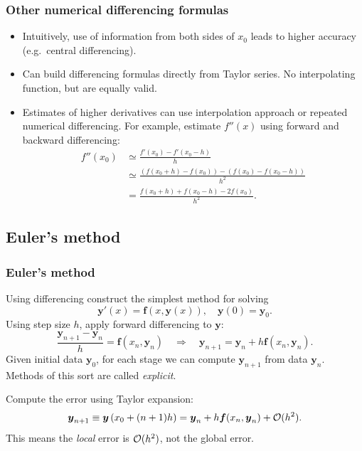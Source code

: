 \documentclass{beamer}
\newcommand{\by}{{\boldsymbol{y}}}
\newcommand{\bfm}[1]{{\boldsymbol{#1}}}
\begin{document}
\begin{frame}
  \frametitle{Other numerical differencing formulas}

  \begin{itemize}
  \item Intuitively, use of information from both sides of $x_0$ leads
    to higher accuracy (e.g.\ central differencing). \pause
  \item Can build differencing formulas directly from Taylor
    series. No interpolating function, but are equally valid.  \pause
  \item Estimates of higher derivatives can use interpolation approach
    or repeated numerical differencing. For example, estimate $f''(x)$
    using forward and backward differencing:
    \begin{align*}
      f''(x_0) & \simeq \frac{f'(x_0) - f'(x_0 - h)}{h} \\
               & \simeq \frac{\left(f(x_0 + h) - f(x_0) \right) -
                 \left(f(x_0) - f(x_0 - h) \right)}{h^2} \\
               & = \frac{f(x_0 + h) + f(x_0 - h) - 2 f(x_0)}{h^2}.
    \end{align*}
  \end{itemize}
\end{frame}


\subsection{Euler's method}


\begin{frame}
  \frametitle{Euler's method}

  Using differencing construct the simplest method for solving
  \begin{equation*}
    \by'(x) = \bfm{f}(x, \by(x)), \quad \by(0) = \by_0.
  \end{equation*}
  Using step size $h$, apply forward differencing to $\by$:
  \begin{equation*}
    \frac{\by_{n+1} - \by_n}{h} = \bfm{f}(x_n, \by_n) \quad
    \Rightarrow \quad \by_{n+1}  = \by_n + h \bfm{f}(x_n, \by_n).
  \end{equation*} \pause
  Given initial data $\by_0$, for each stage we can compute
  $\by_{n+1}$ from data $\by_n$. Methods of this sort are called
  \emph{explicit}. \pause

  \vspace{1ex}

  Compute the error using Taylor expansion:
  \begin{equation*}
    \by_{n+1} \equiv \by \left(x_0 + (n+1) h \right) = \by_n + h
    \bfm{f}(x_n, \by_n) + {\cal O}(h^2).
  \end{equation*} \pause
  This means the \emph{local} error is ${\cal O}(h^2)$, not the global
  error.

\end{frame}
\end{document}
